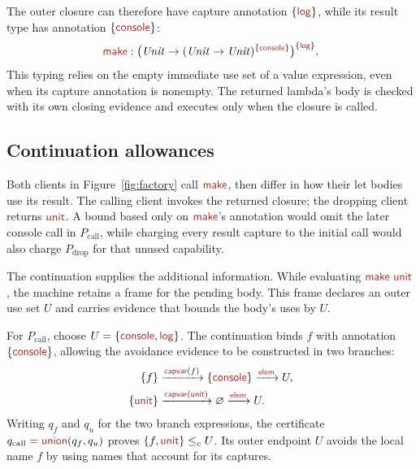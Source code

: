 


The outer closure can therefore have capture annotation $\{\ev{log}\}$,
while its result type has annotation $\{\ev{console}\}$:
\[
 \ev{make}:
 \bigl(\ty{Unit}\to
       (\ty{Unit}\to\ty{Unit})^{\{\ev{console}\}}\bigr)^{\{\ev{log}\}}.
\]
This typing relies on the empty immediate use set of a value expression,
even when its capture annotation is nonempty. The returned lambda's body
is checked with its own closing evidence and executes only when the
closure is called.


\FloatBarrier
\subsection*{Continuation allowances}
Both clients in Figure~\ref{fig:factory} call $\ev{make}$, then differ in
how their let bodies use its result. The calling client invokes the
returned closure; the dropping client returns $\ev{unit}$. A bound based
only on $\ev{make}$'s annotation would omit the later console call in
$P_{\mathrm{call}}$, while charging every result capture to the initial
call would also charge $P_{\mathrm{drop}}$ for that unused capability.

The continuation supplies the additional information. While evaluating
$\ev{make}\ \ev{unit}$, the machine retains a frame for the pending
body. This frame declares an outer use set $U$ and carries evidence
that bounds the body's uses by $U$.

For $P_{\mathrm{call}}$, choose $U=\{\ev{console},\ev{log}\}$.
The continuation binds $f$ with annotation $\{\ev{console}\}$, allowing
the avoidance evidence to be constructed in two branches:
\[
 \begin{aligned}
 \{f\}&\xrightarrow{\ev{capvar}(f)}\{\ev{console}\}
          \xrightarrow{\ev{elem}}U,\\
 \{\ev{unit}\}&\xrightarrow{\ev{capvar}(\ev{unit})}\varnothing
          \xrightarrow{\ev{elem}}U.
 \end{aligned}
\]
Writing $q_f$ and $q_u$ for the two branch expressions, the certificate
$q_{\mathrm{call}}=\ev{union}(q_f,q_u)$ proves
$\{f,\ev{unit}\}\le_c U$. Its outer endpoint $U$ avoids the local name
$f$ by using names that account for its captures.


